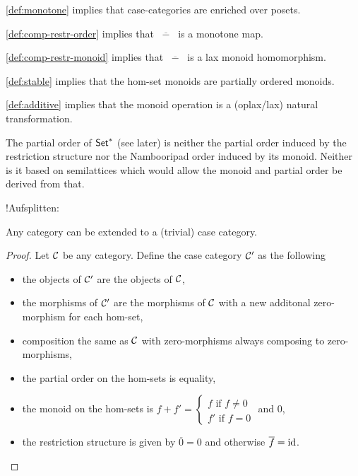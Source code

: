 \documentclass[runningheads,envcountsame]{llncs}
\begin{document}
\begin{remark}
    \ref{def:monotone} implies that case-categories are enriched over posets.
    
    \ref{def:comp-restr-order} implies that $\overline{\;-\;}$ is a monotone map. 
    
    \ref{def:comp-restr-monoid} implies that $\overline{\;-\;}$ is a lax monoid homomorphism.
    
    \ref{def:stable} implies that the hom-set monoids are partially ordered monoids.
    
    \ref{def:additive} implies that the monoid operation is a (oplax/lax) natural transformation.
\end{remark}
\begin{remark}
    The partial order of $\mathsf{Set}^*$ (see later) is neither the partial order induced by the restriction structure nor the Nambooripad order induced by its monoid. Neither is it based on semilattices which would allow the monoid and partial order be derived from that.
\end{remark}

!Aufsplitten:
\begin{lemma}
    Any category can be extended to a (trivial) case category.
\end{lemma}
\begin{proof}
    Let $\mathcal{C}$ be any category. Define the case category $\mathcal{C}'$ as the following
    \begin{itemize}
        \item the objects of $\mathcal{C}'$ are the objects of $\mathcal{C}$,
        \item the morphisms of $\mathcal{C}'$ are the morphisms of $\mathcal{C}$ with a new additonal zero-morphism for each hom-set,
        \item composition the same as $\mathcal{C}$ with zero-morphisms always composing to zero-morphisms,
        \item the partial order on the hom-sets is equality,
        \item the monoid on the hom-sets is $f + f' = \begin{cases}
            f \text{ if } f \neq 0 \\
            f' \text{ if } f = 0
        \end{cases}$ and $0$,
        \item the restriction structure is given by $\overline{0} = 0$ and otherwise $\overline{f} = \id$.
    \end{itemize}
\end{proof}
\end{document}
